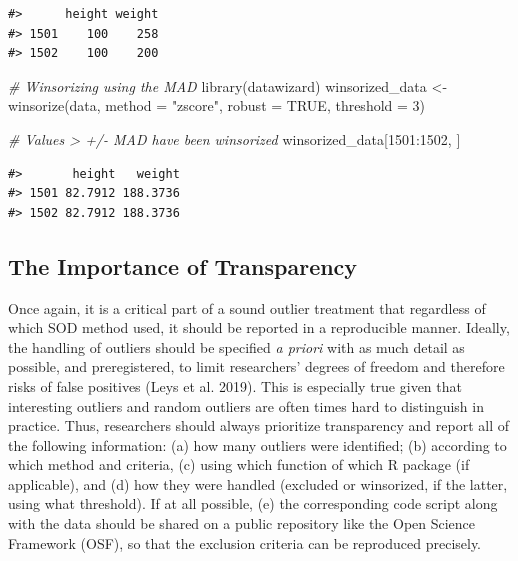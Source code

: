 \documentclass{article}
\newenvironment{Shaded}{\begin{snugshade}}{\end{snugshade}}
\newcommand{\AttributeTok}[1]{\textcolor[rgb]{0.77,0.63,0.00}{#1}}
\newcommand{\CommentTok}[1]{\textcolor[rgb]{0.56,0.35,0.01}{\textit{#1}}}
\newcommand{\ConstantTok}[1]{\textcolor[rgb]{0.00,0.00,0.00}{#1}}
\newcommand{\DecValTok}[1]{\textcolor[rgb]{0.00,0.00,0.81}{#1}}
\newcommand{\FunctionTok}[1]{\textcolor[rgb]{0.00,0.00,0.00}{#1}}
\newcommand{\NormalTok}[1]{#1}
\newcommand{\OtherTok}[1]{\textcolor[rgb]{0.56,0.35,0.01}{#1}}
\newcommand{\SpecialCharTok}[1]{\textcolor[rgb]{0.00,0.00,0.00}{#1}}
\newcommand{\StringTok}[1]{\textcolor[rgb]{0.31,0.60,0.02}{#1}}
\begin{document}
\begin{verbatim}
#>      height weight
#> 1501    100    258
#> 1502    100    200
\end{verbatim}

\begin{Shaded}
\begin{Highlighting}[]
\CommentTok{\# Winsorizing using the MAD}
\FunctionTok{library}\NormalTok{(datawizard)}
\NormalTok{winsorized\_data }\OtherTok{\textless{}{-}} \FunctionTok{winsorize}\NormalTok{(data, }\AttributeTok{method =} \StringTok{"zscore"}\NormalTok{, }\AttributeTok{robust =} \ConstantTok{TRUE}\NormalTok{, }\AttributeTok{threshold =} \DecValTok{3}\NormalTok{)}

\CommentTok{\# Values \textgreater{} +/{-} MAD have been winsorized}
\NormalTok{winsorized\_data[}\DecValTok{1501}\SpecialCharTok{:}\DecValTok{1502}\NormalTok{, ]}
\end{Highlighting}
\end{Shaded}

\begin{verbatim}
#>       height   weight
#> 1501 82.7912 188.3736
#> 1502 82.7912 188.3736
\end{verbatim}

\hypertarget{the-importance-of-transparency}{%
\subsection{The Importance of
Transparency}\label{the-importance-of-transparency}}

Once again, it is a critical part of a sound outlier treatment that
regardless of which SOD method used, it should be reported in a
reproducible manner. Ideally, the handling of outliers should be
specified \emph{a priori} with as much detail as possible, and
preregistered, to limit researchers' degrees of freedom and therefore
risks of false positives (Leys et al. 2019). This is especially true
given that interesting outliers and random outliers are often times hard
to distinguish in practice. Thus, researchers should always prioritize
transparency and report all of the following information: (a) how many
outliers were identified; (b) according to which method and criteria,
(c) using which function of which R package (if applicable), and (d) how
they were handled (excluded or winsorized, if the latter, using what
threshold). If at all possible, (e) the corresponding code script along
with the data should be shared on a public repository like the Open
Science Framework (OSF), so that the exclusion criteria can be
reproduced precisely.
\end{document}

